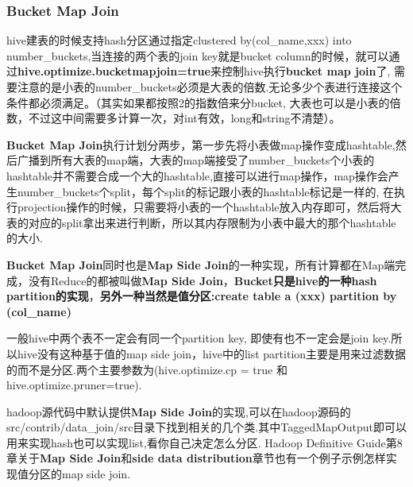 \subsubsection{Bucket Map Join}
\par hive建表的时候支持hash分区通过指定clustered by(col\_name,xxx) into number\_buckets,当连接的两个表的join key就是bucket column的时候，就可以通过\textbf{hive.optimize.bucketmapjoin=true}来控制hive执行\textbf{bucket map join}了, 需要注意的是小表的number\_buckets必须是大表的倍数.无论多少个表进行连接这个条件都必须满足。（其实如果都按照2的指数倍来分bucket, 大表也可以是小表的倍数，不过这中间需要多计算一次，对int有效，long和string不清楚）。
\par \textbf{Bucket Map Join}执行计划分两步，第一步先将小表做map操作变成hashtable,然后广播到所有大表的map端，大表的map端接受了number\_buckets个小表的hashtable并不需要合成一个大的hashtable,直接可以进行map操作，map操作会产生number\_buckets个split，每个split的标记跟小表的hashtable标记是一样的, 在执行projection操作的时候，只需要将小表的一个hashtable放入内存即可，然后将大表的对应的split拿出来进行判断，所以其内存限制为小表中最大的那个hashtable的大小.
\par \textbf{Bucket Map Join}同时也是\textbf{Map Side Join}的一种实现，所有计算都在Map端完成，没有Reduce的都被叫做\textbf{Map Side Join}，\textbf{Bucket只是hive的一种hash partition的实现}，\textbf{另外一种当然是值分区:create table a  (xxx) partition by (col\_name)}
\par 一般hive中两个表不一定会有同一个partition key, 即使有也不一定会是join key.所以hive没有这种基于值的map side join，hive中的list partition主要是用来过滤数据的而不是分区.两个主要参数为(hive.optimize.cp = true 和hive.optimize.pruner=true).
\par hadoop源代码中默认提供\textbf{Map Side Join}的实现,可以在hadoop源码的src/contrib/data\_join/src目录下找到相关的几个类.其中TaggedMapOutput即可以用来实现hash也可以实现list,看你自己决定怎么分区. Hadoop Definitive Guide第8章关于\textbf{Map Side Join}和\textbf{side data distribution}章节也有一个例子示例怎样实现值分区的map side join.
